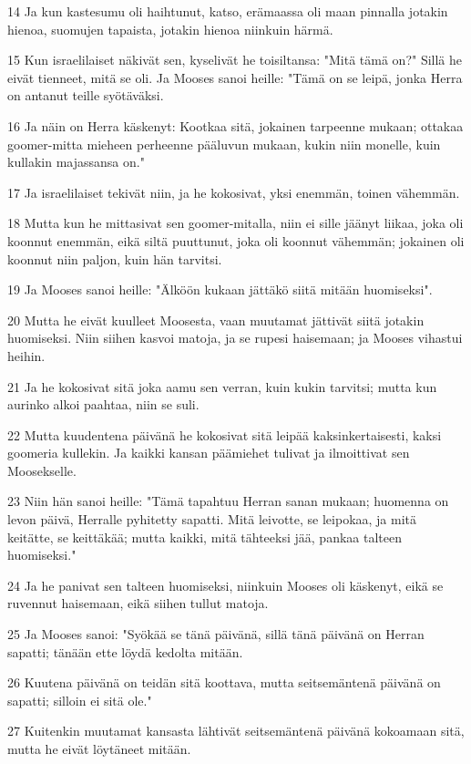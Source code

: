 \par 14 Ja kun kastesumu oli haihtunut, katso, erämaassa oli maan pinnalla jotakin hienoa, suomujen tapaista, jotakin hienoa niinkuin härmä.
\par 15 Kun israelilaiset näkivät sen, kyselivät he toisiltansa: "Mitä tämä on?" Sillä he eivät tienneet, mitä se oli. Ja Mooses sanoi heille: "Tämä on se leipä, jonka Herra on antanut teille syötäväksi.
\par 16 Ja näin on Herra käskenyt: Kootkaa sitä, jokainen tarpeenne mukaan; ottakaa goomer-mitta mieheen perheenne pääluvun mukaan, kukin niin monelle, kuin kullakin majassansa on."
\par 17 Ja israelilaiset tekivät niin, ja he kokosivat, yksi enemmän, toinen vähemmän.
\par 18 Mutta kun he mittasivat sen goomer-mitalla, niin ei sille jäänyt liikaa, joka oli koonnut enemmän, eikä siltä puuttunut, joka oli koonnut vähemmän; jokainen oli koonnut niin paljon, kuin hän tarvitsi.
\par 19 Ja Mooses sanoi heille: "Älköön kukaan jättäkö siitä mitään huomiseksi".
\par 20 Mutta he eivät kuulleet Moosesta, vaan muutamat jättivät siitä jotakin huomiseksi. Niin siihen kasvoi matoja, ja se rupesi haisemaan; ja Mooses vihastui heihin.
\par 21 Ja he kokosivat sitä joka aamu sen verran, kuin kukin tarvitsi; mutta kun aurinko alkoi paahtaa, niin se suli.
\par 22 Mutta kuudentena päivänä he kokosivat sitä leipää kaksinkertaisesti, kaksi goomeria kullekin. Ja kaikki kansan päämiehet tulivat ja ilmoittivat sen Moosekselle.
\par 23 Niin hän sanoi heille: "Tämä tapahtuu Herran sanan mukaan; huomenna on levon päivä, Herralle pyhitetty sapatti. Mitä leivotte, se leipokaa, ja mitä keitätte, se keittäkää; mutta kaikki, mitä tähteeksi jää, pankaa talteen huomiseksi."
\par 24 Ja he panivat sen talteen huomiseksi, niinkuin Mooses oli käskenyt, eikä se ruvennut haisemaan, eikä siihen tullut matoja.
\par 25 Ja Mooses sanoi: "Syökää se tänä päivänä, sillä tänä päivänä on Herran sapatti; tänään ette löydä kedolta mitään.
\par 26 Kuutena päivänä on teidän sitä koottava, mutta seitsemäntenä päivänä on sapatti; silloin ei sitä ole."
\par 27 Kuitenkin muutamat kansasta lähtivät seitsemäntenä päivänä kokoamaan sitä, mutta he eivät löytäneet mitään.
